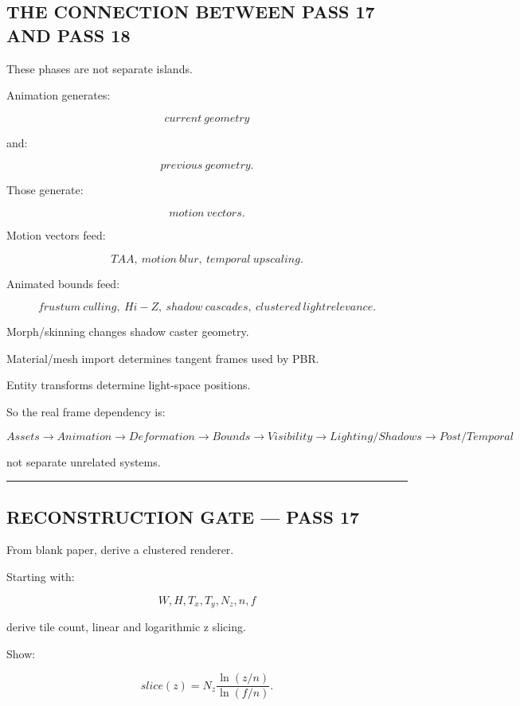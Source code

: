 \subsection{THE CONNECTION BETWEEN PASS 17 AND PASS 18}\label{04-visual-computing-ii-ch041-the-connection-between-pass-17-and-pass-18}

These phases are not separate islands.

Animation generates:

\[
current\ geometry
\]

and:

\[
previous\ geometry.
\]

Those generate:

\[
motion\ vectors.
\]

Motion vectors feed:

\[
TAA,\ motion\ blur,\ temporal\ upscaling.
\]

Animated bounds feed:

\[
frustum\ culling,\ Hi-Z,\ shadow\ cascades,\ clustered\ light relevance.
\]

Morph/skinning changes shadow caster geometry.

Material/mesh import determines tangent frames used by PBR.

Entity transforms determine light-space positions.

So the real frame dependency is:

\[
\boxed{
Assets
\rightarrow
Animation
\rightarrow
Deformation
\rightarrow
Bounds
\rightarrow
Visibility
\rightarrow
Lighting/Shadows
\rightarrow
Post/Temporal
}
\]

not separate unrelated systems.

\begin{center}\rule{0.5\linewidth}{0.5pt}\end{center}

\subsection{RECONSTRUCTION GATE --- PASS 17}\label{04-visual-computing-ii-ch041-reconstruction-gate-pass-17}

From blank paper, derive a clustered renderer.

Starting with:

\[
W,H,T_x,T_y,N_z,n,f
\]

derive tile count, linear and logarithmic z slicing.

Show:

\[
slice(z)
=
N_z
\frac{
\ln(z/n)
}{
\ln(f/n)
}.
\]

